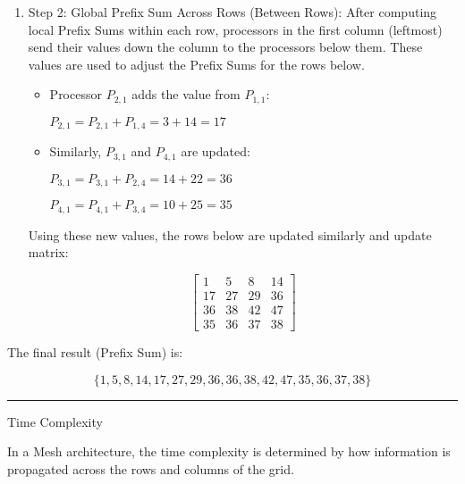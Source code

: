 \documentclass[a4paper,10pt]{article}
\begin{document}
\begin{enumerate}
        \item Step 2: Global Prefix Sum Across Rows (Between Rows): After computing local Prefix Sums within each row, processors in the first column (leftmost) send their values down the column to the processors below them. These values are used to adjust the Prefix Sums for the rows below.

        \begin{itemize}
            
            \item Processor $P_{2,1}$ adds the value from $P_{1,1}$:
            
            $P_{2,1}=P_{2,1}+P_{1,4}=3+14=17$
            
            \item Similarly, $P_{3,1}$ and $P_{4,1}$ are updated:
            
            $P_{3,1}=P_{3,1}+P_{2,4}=14+22=36$

            $P_{4,1}=P_{4,1}+P_{3,4}=10+25=35$

        \end{itemize}

        Using these new values, the rows below are updated similarly and update matrix:

        \[
            \begin{bmatrix}
                
                1  & 5  & 8  & 14 \\
                17 & 27 & 29 & 36 \\
                36 & 38 & 42 & 47 \\
                35 & 36 & 37 & 38
    
            \end{bmatrix}
        \]

    \end{enumerate}

    The final result (Prefix Sum) is:

    $$\{1,5,8,14,17,27,29,36,36,38,42,47,35,36,37,38\}$$

    \begin{center}
        \noindent\rule{0.5\linewidth}{0.4pt}
    \end{center}


    {\bold Time Complexity}

    In a Mesh architecture, the time complexity is determined by how information is propagated across the rows and columns of the grid.
\end{document}
